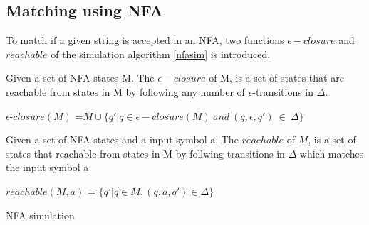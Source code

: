 \subsection{Matching using NFA}
To match if a given string is accepted in an NFA, two functions $\epsilon-closure$ and $reachable$ of the simulation algorithm \ref{nfasim} is introduced.
\begin{mydef}
Given a set of NFA states M. The $\epsilon - closure$ of M, is a set of states that are reachable from states in M by following any number of $\epsilon$-transitions in $\Delta$.
\begin{center}
$\epsilon$-$closure(M)$ =$ M \cup \{q'|q\in \epsilon-closure(M) ~and ~(q,\epsilon,q') ~ \in ~ \Delta\}$
\end{center}
\cite[p. 34, def 2.2]{compile}
\end{mydef}

\begin{mydef}
Given a set of NFA states and a input symbol a. The $reachable$ of $M$, is a set of states that reachable from states in M by follwing transitions in $\Delta$ which matches the input symbol a 
\begin{center}
$reachable(M,a)$ = $\{q'|q \in M,(q,a,q')\in \Delta \}$
\end{center}
\end{mydef}
\begin{algorithm}
  \caption{NFA simulation
    \label{nfasim}}
  \begin{algorithmic}[1]
            \State {}
        \EndIf
      \EndFor
        \State {}
      \EndIf
      \State {}
    \EndFunction
  \end{algorithmic}
\end{algorithm}

